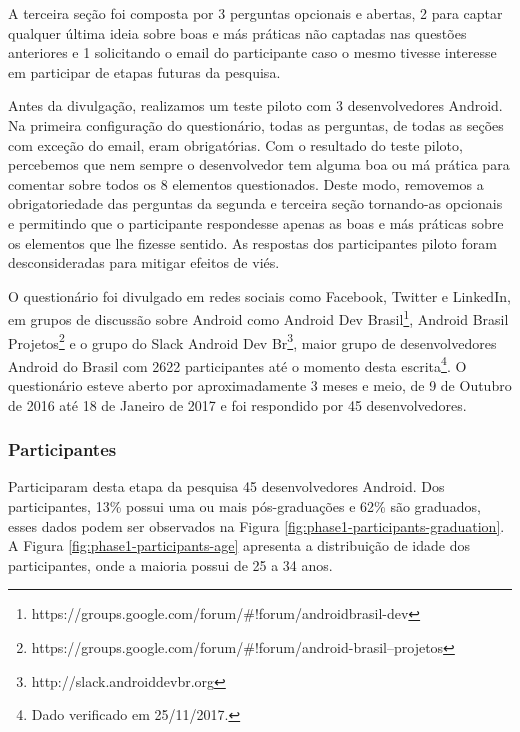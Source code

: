 A terceira seção foi composta por 3 perguntas opcionais e abertas, 2 para captar qualquer última ideia sobre boas e más práticas não captadas nas questões anteriores e 1 solicitando o email do participante caso o mesmo tivesse interesse em participar de etapas futuras da pesquisa. 

Antes da divulgação, realizamos um teste piloto com 3 desenvolvedores Android. Na primeira configuração do questionário, todas as perguntas, de todas as seções com exceção do email, eram obrigatórias. Com o resultado do teste piloto, percebemos que nem sempre o desenvolvedor tem alguma boa ou má prática para comentar sobre todos os 8 elementos questionados. Deste modo, removemos a obrigatoriedade das perguntas da segunda e terceira seção tornando-as opcionais e permitindo que o participante respondesse apenas as boas e más práticas sobre os elementos que lhe fizesse sentido. As respostas dos participantes piloto foram desconsideradas para mitigar efeitos de viés. 

O questionário foi divulgado em redes sociais como Facebook, Twitter e LinkedIn, em grupos de discussão sobre Android como Android Dev Brasil\footnote{https://groups.google.com/forum/\#!forum/androidbrasil-dev}, Android Brasil Projetos\footnote{https://groups.google.com/forum/\#!forum/android-brasil--projetos} e o grupo do Slack Android Dev Br\footnote{http://slack.androiddevbr.org}, maior grupo de desenvolvedores Android do Brasil com 2622 participantes até o momento desta escrita\footnote{Dado verificado em 25/11/2017.}. O questionário esteve aberto por aproximadamente 3 meses e meio, de 9 de Outubro de 2016 até 18 de Janeiro de 2017 e foi respondido por 45 desenvolvedores. 



\subsubsection{Participantes}
\label{etapa-1-participantes}

Participaram desta etapa da pesquisa 45 desenvolvedores Android. Dos participantes, 13\% possui uma ou mais pós-graduações e 62\% são graduados, esses dados podem ser observados na Figura \ref{fig:phase1-participants-graduation}. A Figura \ref{fig:phase1-participants-age} apresenta a distribuição de idade dos participantes, onde a maioria possui de 25 a 34 anos.  

